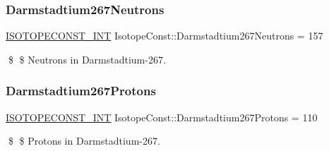 \subsubsection{\texorpdfstring{Darmstadtium267\+Neutrons}{Darmstadtium267Neutrons}}
{\footnotesize\ttfamily \mbox{\hyperlink{group___isotope_const-_macros_ga5f18360b3e99483a35c32d789e62621c}{I\+S\+O\+T\+O\+P\+E\+C\+O\+N\+S\+T\+\_\+\+I\+NT}} Isotope\+Const\+::\+Darmstadtium267\+Neutrons = 157}

\$ \$ Neutrons in Darmstadtium-\/267. \mbox{\label{group___isotope_const-_darmstadtium-_ds267_gacb06252fd0f67c15af292f3a11eac812}} 
\subsubsection{\texorpdfstring{Darmstadtium267\+Protons}{Darmstadtium267Protons}}
{\footnotesize\ttfamily \mbox{\hyperlink{group___isotope_const-_macros_ga5f18360b3e99483a35c32d789e62621c}{I\+S\+O\+T\+O\+P\+E\+C\+O\+N\+S\+T\+\_\+\+I\+NT}} Isotope\+Const\+::\+Darmstadtium267\+Protons = 110}

\$ \$ Protons in Darmstadtium-\/267. 